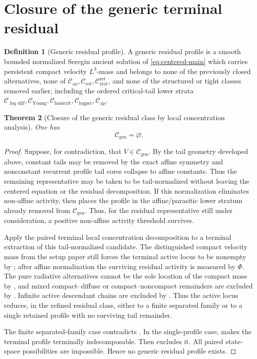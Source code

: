 \documentclass[11pt]{amsart}
\numberwithin{equation}{section}
\theoremstyle{plain}
\newtheorem{theorem}{Theorem}[section]
\theoremstyle{definition}
\newtheorem{definition}[theorem]{Definition}
\theoremstyle{remark}
\newcommand{\Cax}{\mathcal C_{\mathrm{ax}}}
\newcommand{\Crot}{\mathcal C_{\mathrm{rot}}}
\newcommand{\Cstat}{\mathcal C_{\mathrm{stat}}^{\mathrm{ret}}}
\newcommand{\Cgen}{\mathcal C_{\mathrm{gen}}}
\newcommand{\Chomcrit}{\mathcal C_{\mathrm{homcrit}}}
\newcommand{\Clogper}{\mathcal C_{\mathrm{logper}}}
\newcommand{\Capcrit}{\mathcal C_{\mathrm{ap}}}
\newcommand{\Cyoung}{\mathcal C_{\mathrm{Young}}}
\newcommand{\Clogdiff}{\mathcal C_{\log\mathrm{diff}}}
\begin{document}
\section{Closure of the generic terminal residual}
\label{sec:R4-closure}

\begin{definition}[Generic residual profile]
\label{def:R4-profile-main}
A generic residual profile is a smooth bounded normalized Seregin ancient solution of
\eqref{eq:centered-main} which carries persistent compact velocity
\(L^3\)-mass and
belongs to none of the previously closed alternatives, none of
\(\Cax,\Crot,\Cstat\), and none of the structured or tight
classes removed earlier, including the ordered critical-tail lower strata
\(\Clogdiff,\Cyoung,\Chomcrit,\Clogper,\Capcrit\).
\end{definition}

\begin{theorem}[Closure of the generic residual class by local concentration analysis]
\label{thm:R4-final-closure}
One has
\[
   \Cgen=\varnothing .
\]
\end{theorem}

\begin{proof}
Suppose, for contradiction, that \(V\in\Cgen\).  By the tail geometry
developed above, constant tails may be removed by the exact affine symmetry
and nonconstant recurrent profile tail cores collapse to affine constants.
Thus the remaining representative may be taken to be tail-normalized without
leaving the centered equation or the residual decomposition.  If this
normalization eliminates non-affine activity, then
 places the profile in the
affine/parasitic lower stratum already removed from \(\Cgen\).  Thus, for the
residual representative still under consideration, a positive non-affine
activity threshold survives.

Apply the paired terminal local concentration decomposition to a terminal
extraction of this tail-normalized candidate.  The distinguished compact
velocity mass from the setup paper still forces the terminal active locus to be
nonempty by ; after affine normalization the
surviving residual activity is measured by \(\Phi\).  The pure radiative
alternatives cannot be the sole location of the compact mass by
, and mixed compact--diffuse or
compact--noncompact remainders are excluded by
.  Infinite active descendant chains are excluded by
.  Thus the active locus reduces, in the
refined residual class, either to a finite separated family or to a single
retained profile with no surviving tail remainder.

The finite separated-family case contradicts
.  In the single-profile case,
 makes the terminal profile terminally
indecomposable.  Then  excludes it.  All paired
state-space possibilities are impossible.  Hence no generic residual profile
exists.
\end{proof}
\end{document}
